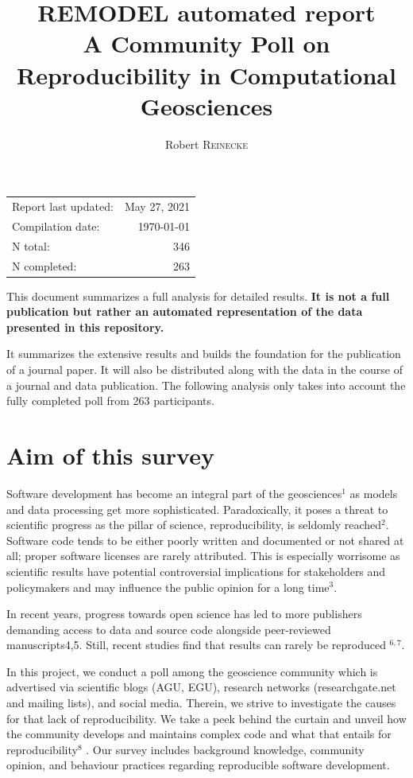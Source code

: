 \documentclass{article}
\title{\textbf{REMODEL automated report} \\ A Community Poll on Reproducibility in Computational Geosciences} %
\author{Robert \textsc{Reinecke}} %
\begin{document}
\maketitle %

\begin{center}
\begin{tabular}{l r}
Report last updated: & May 27, 2021\\
Compilation date: & \today \\
N total: & 346 \\
N completed: & 263\\
\end{tabular}
\end{center}

This document summarizes a full analysis for detailed results. \textbf{It is not a full publication but rather an automated representation of the data presented in this repository.}

It summarizes the extensive results and builds the foundation for the publication of a journal paper.
It will also be distributed along with the data in the course of a journal and data publication.
The following analysis only takes into account the fully completed poll from 263 participants.

\thispagestyle{empty}

\tableofcontents
\listoffigures

\newpage

\section{Aim of this survey}
Software development has become an integral part of the geosciences$^{1}$ as models and data processing get more sophisticated.
Paradoxically, it poses a threat to scientific progress as the pillar of science, reproducibility, is seldomly reached$^{2}$.
Software code tends to be either poorly written and documented or not shared at all; proper software licenses are rarely attributed.
This is especially worrisome as scientific results have potential controversial implications for stakeholders and policymakers and may influence the public opinion for a long time$^{3}$.

In recent years, progress towards open science has led to more publishers demanding access to data and source code alongside peer-reviewed manuscripts4,5. Still, recent studies find that results can rarely be reproduced $^{6,7}$.

In this project, we conduct a poll among the geoscience community which is advertised via scientific blogs (AGU, EGU), research networks (researchgate.net and mailing lists), and social media.
Therein, we strive to investigate the causes for that lack of reproducibility.
We take a peek behind the curtain and unveil how the community develops and maintains complex code and what that entails for reproducibility$^{8}$ .
Our survey includes background knowledge, community opinion, and behaviour practices regarding reproducible software development.
\end{document}
